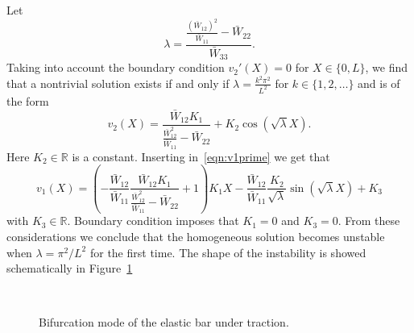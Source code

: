 \documentclass[a4paper,10pt,oneside]{amsbook}
\numberwithin{section}{chapter}
\numberwithin{equation}{chapter}
\theoremstyle{definition}
\begin{document}
Let
\[
\lambda=\frac{\frac{(\bar W_{12})^2}{\bar W_{11}}-\bar W_{22}}{\bar W_{33}}.
\]
Taking into account the boundary condition $v_2'(X)=0$  for $X\in\{0,L\}$, we find that a nontrivial solution exists if and only if $\lambda=\frac{k^2\pi^2}{L^2}$ for $k\in\{1,2,\dots\}$ and is of the form
\[
v_2(X)=\frac{\bar W_{12}K_1}{\frac{\bar{W}_{12}^2}{\bar{W}_{11}}-\bar W_{22}}+K_2\cos\left(\sqrt{\lambda}X\right).
\]
Here $K_2\in\mathbb{R}$ is a constant. Inserting in~\eqref{eqn:v1prime} we get that
\[
v_1(X)=\left(-\frac{\bar W_{12}}{\bar W_{11}}\frac{\bar W_{12}K_1}{\frac{\bar{W}_{12}^2}{\bar{W}_{11}}-\bar W_{22}}+1\right)K_1X-\frac{\bar{W}_{12}}{\bar{W}_{11}}\frac{K_2}{\sqrt{\lambda}}\sin\left(\sqrt{\lambda}X\right)+K_3
\]
with $K_3\in\mathbb{R}$. Boundary condition imposes that $K_1=0$ and $K_3=0$. From these considerations we conclude that the homogeneous solution becomes unstable when $\lambda=\pi^2/L^2$ for the first time. The shape of the instability is showed schematically in Figure~\ref{fig:instability-mode-elastic}
\begin{figure}[t]
\centering
{}
\\
\caption{Bifurcation mode of the elastic bar under traction.}
\label{fig:instability-mode-elastic}
\end{figure}
\end{document}
